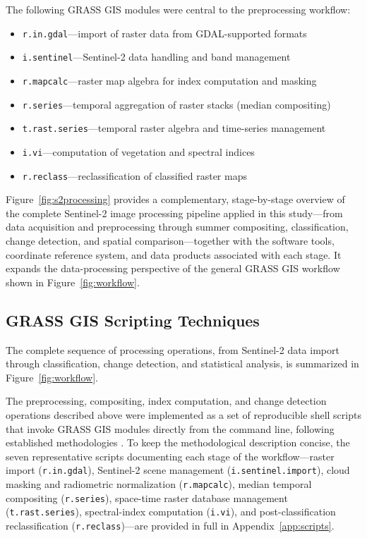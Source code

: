 \documentclass[coasts,article,accept,pdftex,moreauthors]{Definitions/mdpi}
\begin{document}
The following GRASS GIS modules were central to the preprocessing workflow:
\begin{itemize}
\item \texttt{r.in.gdal}---import of raster data from GDAL-supported formats
\item \texttt{i.sentinel}---Sentinel-2 data handling and band management
\item \texttt{r.mapcalc}---raster map algebra for index computation and masking
\item \texttt{r.series}---temporal aggregation of raster stacks (median compositing)
\item \texttt{t.rast.series}---temporal raster algebra and time-series management
\item \texttt{i.vi}---computation of vegetation and spectral indices
\item \texttt{r.reclass}---reclassification of classified raster maps
\end{itemize}

{Figure~\ref{fig:s2processing} provides a complementary, stage-by-stage overview of the complete Sentinel-2 image processing pipeline applied in this study---from data acquisition and preprocessing through summer compositing, classification, change detection, and spatial comparison---together with the software tools, coordinate reference system, and data products associated with each stage. It expands the data-processing perspective of the general GRASS GIS workflow shown in Figure~\ref{fig:workflow}.}


\subsection{GRASS GIS Scripting Techniques}
\label{sec:scripting}

{The complete sequence of processing operations, from Sentinel-2 data import through classification, change detection, and statistical analysis, is summarized in Figure~\ref{fig:workflow}.}


{The preprocessing, compositing, index computation, and change detection operations described above were implemented as a set of reproducible shell scripts that invoke GRASS GIS modules directly from the command line, following established methodologies \citep{Lemenkova202405,Lemenkova202322,Lemenkova202323}. To keep the methodological description concise, the seven representative scripts documenting each stage of the workflow---raster import (\texttt{r.in.gdal}), Sentinel-2 scene management (\texttt{i.sentinel.import}), cloud masking and radiometric normalization (\texttt{r.mapcalc}), median temporal compositing (\texttt{r.series}), space-time raster database management (\texttt{t.rast.series}), spectral-index computation (\texttt{i.vi}), and post-classification reclassification (\texttt{r.reclass})---are provided in full in Appendix~\ref{app:scripts}.}
\end{document}
